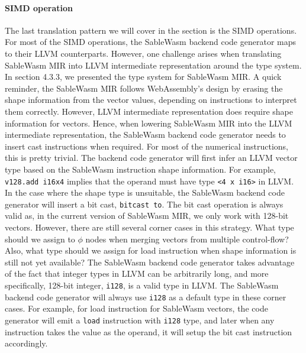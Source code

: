 \paragraph{SIMD operation}
The last translation pattern we will cover in the section is the SIMD
operations. For most of the SIMD operations, the SableWasm backend code
generator maps to their LLVM counterparts. However, one challenge arises when
translating SableWasm MIR into LLVM intermediate representation around the
type system. In section 4.3.3, we presented the type system for SableWasm MIR.
A quick reminder, the SableWasm MIR follows WebAssembly's design by erasing the
shape information from the vector values, depending on instructions to
interpret them correctly. However, LLVM intermediate representation does
require shape information for vectors. Hence, when lowering SableWasm MIR into
the LLVM intermediate representation, the SableWasm backend code generator needs
to insert cast instructions when required. For most of the numerical
instructions, this is pretty trivial. The backend code generator will first
infer an LLVM vector type based on the SableWasm instruction shape information.
For example, \texttt{v128.add i16x4} implies that the operand must have type
\texttt{<4 x i16>} in LLVM. In the case where the shape type is unsuitable,
the SableWasm backend code generator will insert a bit cast,
\texttt{bitcast to}. The bit cast operation is always valid as, in the current
version of SableWasm MIR, we only work with 128-bit vectors. However, there
are still several corner cases in this strategy. What type should we assign to
$\phi$ nodes when merging vectors from multiple control-flow? Also, what type
should we assign for load instruction when shape information is still not yet
available? The SableWasm backend code generator takes advantage of the fact
that integer types in LLVM can be arbitrarily long, and more specifically,
128-bit integer, \texttt{i128}, is a valid type in LLVM. The SableWasm backend
code generator will always use \texttt{i128} as a default type in these corner
cases. For example, for load instruction for SableWasm vectors, the code
generator will emit a \texttt{load} instruction with \texttt{i128} type, and
later when any instruction takes the value as the operand, it will setup the
bit cast instruction accordingly.